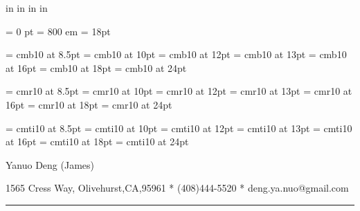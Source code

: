 




 in     %
 in    %
 in  %
 in  %

\nopagenumbers

\parindent = 0 pt
\emergencystretch = 800 em
\baselineskip = 18pt


\font\FFba=      cmb10            at 8.5pt
\font\FFbb=      cmb10            at 10pt
\font\FFbc=      cmb10            at 12pt
\font\FFbd=      cmb10            at 13pt
\font\FFbe=      cmb10            at 16pt
\font\FFbf=      cmb10            at 18pt
\font\FFbg=      cmb10            at 24pt

\font\FFra=      cmr10            at 8.5pt
\font\FFrb=      cmr10            at 10pt
\font\FFrc=      cmr10            at 12pt
\font\FFrd=      cmr10            at 13pt
\font\FFre=      cmr10            at 16pt
\font\FFrf=      cmr10            at 18pt
\font\FFrg=      cmr10            at 24pt

\font\FFta=      cmti10           at 8.5pt
\font\FFtb=      cmti10           at 10pt
\font\FFtc=      cmti10           at 12pt
\font\FFtd=      cmti10           at 13pt
\font\FFte=      cmti10           at 16pt
\font\FFtf=      cmti10           at 18pt
\font\FFtg=      cmti10           at 24pt


\FFrd

{
Yanuo Deng (James)
}

{ 
1565 Cress Way, Olivehurst,CA,95961
*
(408)444-5520
*
deng.ya.nuo@gmail.com
}

{ \smallbreak } 
{\par\noindent\hrule} 
{ \medbreak } { 
}

%
%

{ \bigbreak } 

